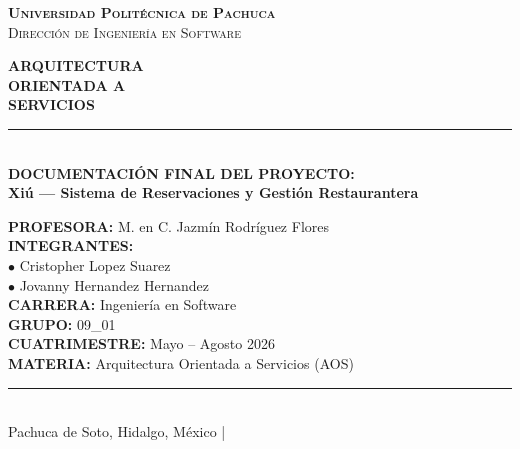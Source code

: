 \documentclass[12pt,a4paper]{article}
\begin{document}

\begin{titlepage}
\vspace*{1.0cm}
\begin{center}
  {\Large\scshape\bfseries Universidad Politécnica de Pachuca}\\[4pt]
  {\small\scshape Dirección de Ingeniería en Software}
\end{center}
\vspace{1.5cm}
\begin{center}
  {\Huge\bfseries ARQUITECTURA\\[6pt]ORIENTADA A\\[6pt]SERVICIOS}\\[16pt]
  \rule{0.6\textwidth}{1.5pt}\\[16pt]
  {\Large\bfseries DOCUMENTACIÓN FINAL DEL PROYECTO:}\\[8pt]
  {\LARGE\bfseries\color{vino}Xiú --- Sistema de Reservaciones y Gestión Restaurantera}
\end{center}
\vspace{1.5cm}
\noindent\textbf{PROFESORA:} M. en C. Jazmín Rodríguez Flores\\[8pt]
\noindent\textbf{INTEGRANTES:}\\[4pt]
\noindent\hspace{1cm}$\bullet$ Cristopher Lopez Suarez\\[4pt]
\noindent\hspace{1cm}$\bullet$ Jovanny Hernandez Hernandez\\[8pt]
\noindent\textbf{CARRERA:} Ingeniería en Software\\[8pt]
\noindent\textbf{GRUPO:} 09\_01\\[8pt]
\noindent\textbf{CUATRIMESTRE:} Mayo -- Agosto 2026\\[8pt]
\noindent\textbf{MATERIA:} Arquitectura Orientada a Servicios (AOS)
\vfill
\begin{center}
  \rule{0.8\textwidth}{0.5pt}\\[4pt]
  {\small Pachuca de Soto, Hidalgo, México \quad | }
\end{center}
\end{titlepage}
\end{document}
